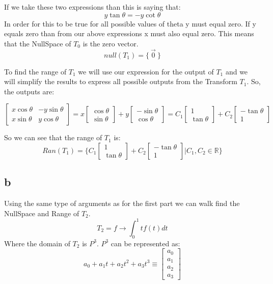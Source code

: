 \documentclass[12pt]{article}
\begin{document}
If we take these two expressions than this is saying that:
$$ y \tan \theta = -y \cot \theta $$
In order for this to be true for all possible values of theta y must equal zero. If y equals zero than from our above expressions x must also equal zero. This means that the NullSpace of $T_{0}$ is the zero vector.
$$ null(T_{1}) = \{\ \vec{0}\ \} $$

To find the range of $T_{1}$ we will use our expression for the output of $T_{1}$ and we will simplify the results to express all possible outputs from the Transform $T_{1}$. So, the outputs are:

\[
\begin{bmatrix}
x \cos \theta & - y \sin \theta\\
x \sin \theta & y \cos \theta
\end{bmatrix}
=
x
\begin{bmatrix}
\cos \theta\\
\sin \theta
\end{bmatrix}
+ y
\begin{bmatrix}
- \sin \theta\\
\cos \theta
\end{bmatrix}
=
C_{1}
\begin{bmatrix}
1\\
\tan \theta
\end{bmatrix}
+
C_{2}
\begin{bmatrix}
- \tan \theta\\
1
\end{bmatrix}
\]

So we can see that the range of $T_{1}$ is:
\[
Ran(T_{1}) = \{
C_{1}
\begin{bmatrix}
1\\
\tan \theta
\end{bmatrix}
+
C_{2}
\begin{bmatrix}
- \tan \theta\\
1
\end{bmatrix}
|
C_{1}, C_{2} \in \mathbb{R}
\}
\]

\subsection*{b}

Using the same type of arguments as for the first part we can walk find the NullSpace and Range of $T_{2}$.
$$T_{2} = f \rightarrow \int_{0}^{1} t f(t) dt$$
Where the domain of $T_{2}$ is $P^{3}$. $P^{3}$ can be represented as:
\[ 
a_{0} + a_{1} t + a_{2} t^{2} + a_{3} t^{3} \equiv 
\begin{bmatrix}
a_{0}\\
a_{1}\\
a_{2}\\
a_{3}
\end{bmatrix}
\]
\end{document}

